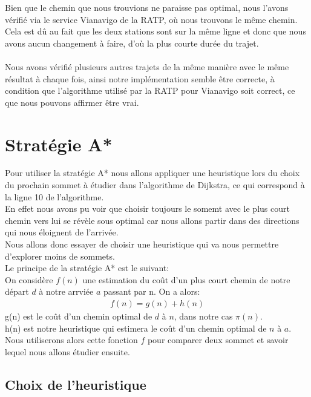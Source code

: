\documentclass{article}
\begin{document}
Bien que le chemin que nous trouvions ne paraisse pas optimal, nous l'avons vérifié via
le service Vianavigo de la RATP, où nous trouvons le même chemin. Cela est dû au fait que
les deux stations sont sur la même ligne et donc que nous avons aucun changement à faire,
d'où la plus courte durée du trajet.\\\\
Nous avons vérifié plusieurs autres trajets de la même manière avec le même résultat à chaque
fois, ainsi notre implémentation semble être correcte, à condition que l'algorithme
utilisé par la RATP pour Vianavigo soit correct, ce que nous pouvons affirmer être vrai.

\pagebreak
\section{Stratégie A*}

Pour utiliser la stratégie A* nous allons appliquer une heuristique lors du choix du prochain
sommet à étudier dans l'algorithme de Dijkstra, ce qui correspond à la ligne 10 de l'algorithme.\\
En effet nous avons pu voir que choisir toujours le somemt avec le plus court chemin vers lui
se révèle sous optimal car nous allons partir dans des directions qui nous éloignent de l'arrivée.\\
Nous allons donc essayer de choisir une heuristique qui va nous permettre d'explorer moins de sommets.\\

Le principe de la stratégie A* est le suivant:\\
On considère $f(n)$ une estimation du  coût d'un plus court chemin de notre départ $d$ à notre arrviée $a$ passant par n.
On a alors:
\begin{gather*}
		f(n) = g(n) + h(n)
\end{gather*}
g(n) est le coût d'un chemin optimal de $d$ à $n$, dans notre cas $\pi(n)$.\\
h(n) est notre heuristique qui estimera le coût d'un chemin optimal de $n$ à $a$.\\

Nous utiliserons alors cette fonction $f$ pour comparer deux sommet et savoir lequel
nous allons étudier ensuite.

\subsection{Choix de l'heuristique}
\end{document}
